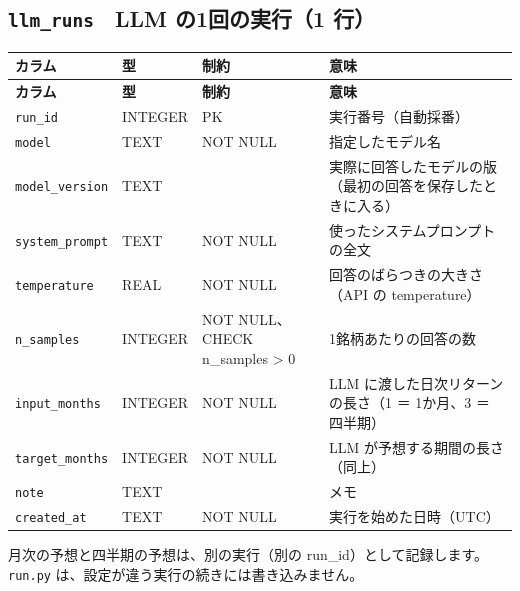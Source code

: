 \documentclass[xelatex,ja=standard,jafont=hiragino-pron,a4paper,10pt]{bxjsreport}
\begin{document}
\subsection*{\texttt{llm\_\allowbreak{}runs}　LLM の1回の実行（1 行）}
{\footnotesize
\begin{longtable}{p{3.30cm}p{1.40cm}p{3.00cm}p{6.40cm}}
\toprule
\textbf{カラム} & \textbf{型} & \textbf{制約} & \textbf{意味} \\
\midrule
\endfirsthead
\toprule
\textbf{カラム} & \textbf{型} & \textbf{制約} & \textbf{意味} \\
\midrule
\endhead
\bottomrule
\endfoot
\texttt{run\_\allowbreak{}id} & INTEGER & PK & 実行番号（自動採番） \\
\texttt{model} & TEXT & NOT NULL & 指定したモデル名 \\
\texttt{model\_\allowbreak{}version} & TEXT &  & 実際に回答したモデルの版（最初の回答を保存したときに入る） \\
\texttt{system\_\allowbreak{}prompt} & TEXT & NOT NULL & 使ったシステムプロンプトの全文 \\
\texttt{temperature} & REAL & NOT NULL & 回答のばらつきの大きさ（API の temperature） \\
\texttt{n\_\allowbreak{}samples} & INTEGER & NOT NULL、CHECK n\_samples \textgreater{} 0 & 1銘柄あたりの回答の数 \\
\texttt{input\_\allowbreak{}months} & INTEGER & NOT NULL & LLM に渡した日次リターンの長さ（1 ＝ 1か月、3 ＝ 四半期） \\
\texttt{target\_\allowbreak{}months} & INTEGER & NOT NULL & LLM が予想する期間の長さ（同上） \\
\texttt{note} & TEXT &  & メモ \\
\texttt{created\_\allowbreak{}at} & TEXT & NOT NULL & 実行を始めた日時（UTC） \\
\end{longtable}
}
{\small 月次の予想と四半期の予想は、別の実行（別の run\_id）として記録します。\texttt{run.py} は、設定が違う実行の続きには書き込みません。\par}
\medskip
\end{document}
